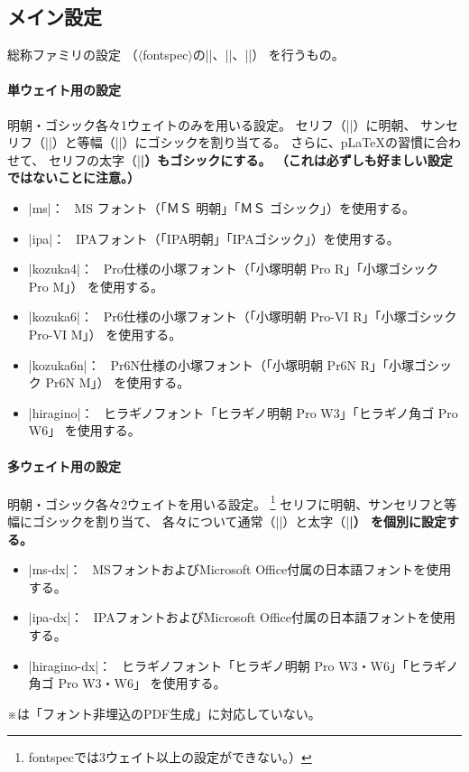 \documentclass[a4paper]{bxjsarticle}
\newcommand{\Pkg}[1]{\textsf{#1}}
\newcommand{\Meta}[1]{$\langle$\mbox{}#1\mbox{}$\rangle$}
\newcommand{\Note}{\par\noindent ※}
\newcommand{\Means}{：\ }
\providecommand{\pLaTeX}{p\LaTeX}
\begin{document}
\subsection{メイン設定}

総称ファミリの設定
（\Meta{fontspec}の|\setmainfont|、|\setsansfont|、|\setmonofont|）
を行うもの。

\paragraph{単ウェイト用の設定}
明朝・ゴシック各々1ウェイトのみを用いる設定。
セリフ（|\rmfamily|）に明朝、
サンセリフ（|\sffamily|）と等幅（|\ttfamily|）にゴシックを割り当てる。
さらに、{\pLaTeX}\>の習慣に合わせて、
セリフの太字（|\bfseries|）もゴシックにする。
（これは必ずしも好ましい設定ではないことに注意。）

\begin{itemize}
\item |ms|\Means
MS フォント（「ＭＳ 明朝」「ＭＳ ゴシック」）を使用する。
\item |ipa|\Means
IPAフォント（「IPA明朝」「IPAゴシック」）を使用する。
\item |kozuka4|\Means
Pro仕様の小塚フォント（「小塚明朝 Pro R」「小塚ゴシック Pro M」）
を使用する。
\item |kozuka6|\Means
Pr6仕様の小塚フォント（「小塚明朝 Pro-VI R」「小塚ゴシック Pro-VI M」）
を使用する。
\item |kozuka6n|\Means
Pr6N仕様の小塚フォント（「小塚明朝 Pr6N R」「小塚ゴシック Pr6N M」）
を使用する。
\item |hiragino|\Means
ヒラギノフォント「ヒラギノ明朝 Pro W3」「ヒラギノ角ゴ Pro W6」
を使用する。
\end{itemize}

\paragraph{多ウェイト用の設定}
明朝・ゴシック各々2ウェイトを用いる設定。%
\footnote{\Pkg{fontspec}では3ウェイト以上の設定ができない。）}
セリフに明朝、サンセリフと等幅にゴシックを割り当て、
各々について通常（|\mdseries|）と太字（|\bfseries|）
を個別に設定する。
\begin{itemize}
\item |ms-dx|\Means
MSフォントおよびMicrosoft Office付属の日本語フォントを使用する。
\item |ipa-dx|\Means
IPAフォントおよびMicrosoft Office付属の日本語フォントを使用する。
\item |hiragino-dx|\Means
ヒラギノフォント「ヒラギノ明朝 Pro W3・W6」「ヒラギノ角ゴ Pro W3・W6」
を使用する。
\end{itemize}
\Note {\XeTeX}\>は「フォント非埋込のPDF生成」に対応していない。
\end{document}
